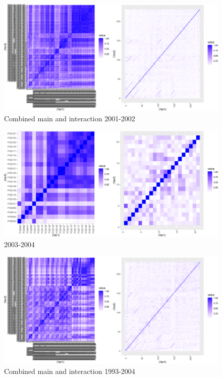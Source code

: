 \documentclass[]{article}
\begin{document}
\begin{figure}
\centering
\includegraphics{PCBs_covariance_files/figure-latex/unnamed-chunk-8-1.pdf}
\caption{Combined main and interaction 2001-2002}
\end{figure}

\begin{figure}
\centering
\includegraphics{PCBs_covariance_files/figure-latex/unnamed-chunk-9-1.pdf}
\caption{2003-2004}
\end{figure}

\begin{figure}
\centering
\includegraphics{PCBs_covariance_files/figure-latex/unnamed-chunk-10-1.pdf}
\caption{Combined main and interaction 1993-2004}
\end{figure}
\end{document}
